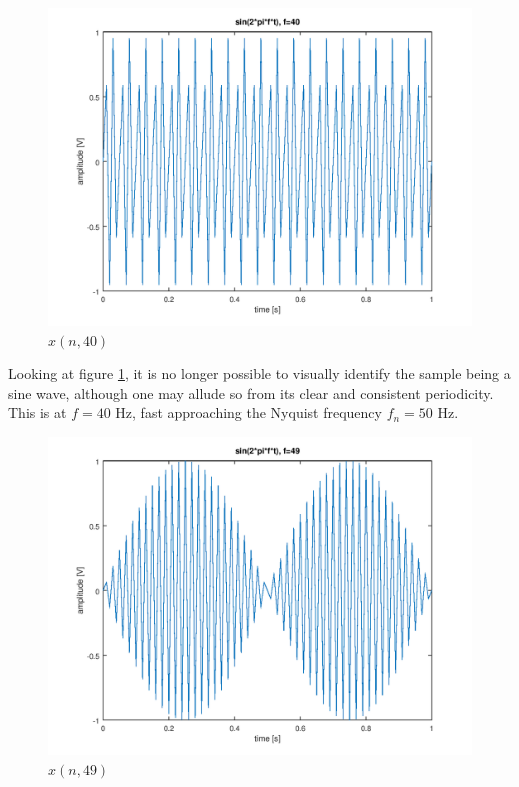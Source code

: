 \documentclass[a4paper, 12pt]{report}
\begin{document}
			\begin{figure}[H]
				\label{fig:8}
				\includegraphics[width=\textwidth]{img/1_8.png}
				\caption{$x(n, 40)$}
			\end{figure}

			Looking at figure \ref{fig:8}, it is no longer possible to visually identify the sample being a sine wave, although one may allude so from its clear and consistent periodicity. This is at $f=40$ Hz, fast approaching the Nyquist frequency $f_n = 50$ Hz.

			\begin{figure}[H]
				\label{fig:9}
				\includegraphics[width=\textwidth]{img/1_9.png}
				\caption{$x(n, 49)$}
			\end{figure}
\end{document}
